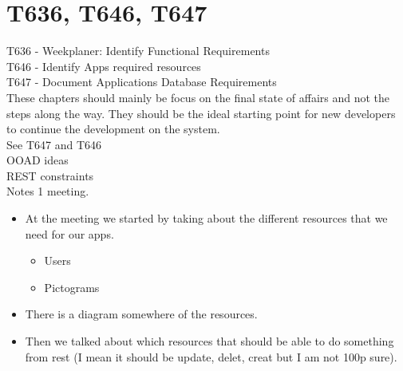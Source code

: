 \chapter{T636, T646, T647}\label{S1CS}

T636 - Weekplaner: Identify Functional Requirements\\
T646 - Identify Apps required resources\\
T647 - Document Applications Database Requirements\\


These chapters should mainly be focus on the final state of affairs and not the
steps along the way. They should be the ideal starting point for new developers
to continue the development on the system.\\


See T647 and T646\\
OOAD ideas\\
REST constraints\\

Notes 1 meeting.\\
\begin{itemize}
  \item At the meeting we started by taking about the different resources that we need
for our apps.
\begin{itemize}
  \item Users
  \item Pictograms
\end{itemize}
\item There is a diagram somewhere of the resources.
\item Then we talked about which resources that should be able to do something
from rest (I mean it should be update, delet, creat but I am not 100p sure).
\end{itemize}

